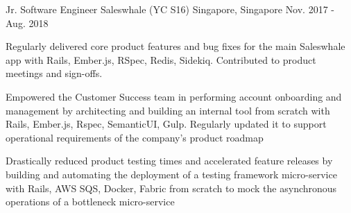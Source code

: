 \begin{cventries}

  \cventry
    {Jr. Software Engineer} %
    {Saleswhale (YC S16)} %
    {Singapore, Singapore} %
    {Nov. 2017 - Aug. 2018} %
    {
      \begin{cvitems} %
      \item { Regularly delivered core product features and bug fixes for the main Saleswhale app with Rails, Ember.js, RSpec, Redis, Sidekiq. Contributed to product meetings and sign-offs.}
      \item { Empowered the Customer Success team in performing account onboarding and management by architecting and building an internal tool from scratch with Rails, Ember.js, Rspec, SemanticUI, Gulp. Regularly updated it to support operational requirements of the company's product roadmap}
      \item { Drastically reduced product testing times and accelerated feature releases by building and automating the deployment of a testing framework micro-service with Rails, AWS SQS, Docker, Fabric from scratch to mock the asynchronous operations of a bottleneck micro-service}
      \end{cvitems}
    }


\end{cventries}
